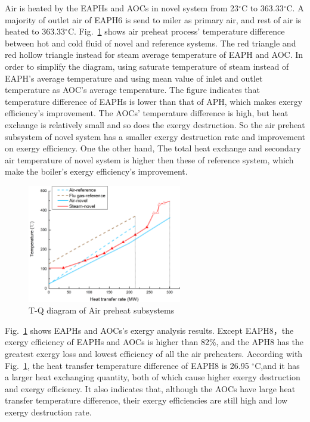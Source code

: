 \documentclass[preprint,12pt]{elsarticle}
\begin{document}
Air is heated by the EAPHs and AOCs in novel system from 23$^\circ$C to 363.33$^\circ$C. 
A majority of outlet air of EAPH6 is send to miler as primary air, and rest of air is heated to 363.33$^\circ$C.
Fig.~\ref{fig:APH_temper_compare} shows air preheat process' temperature difference between hot and cold fluid of novel and reference systems.
The red triangle and red hollow triangle instead for steam average temperature of EAPH and AOC. 
In order to simplify the diagram, using saturate temperature of steam instead of EAPH's average temperature and using mean value of inlet and outlet temperature as AOC's average temperature.
The figure indicates that  temperature difference of EAPHs is lower than that of APH, which makes exergy efficiency's improvement.
The AOCs' temperature difference is high, but heat exchange is relatively small and so does the exergy destruction. 
So the air preheat subsystem  of novel system has a smaller exergy destruction rate and improvement on exergy efficiency.
One the other hand, The total heat exchange  and secondary air temperature of novel system is higher then these of reference system, which make the boiler's exergy efficiency's improvement.

\begin{figure}[htbp]
\centering
\includegraphics[width=0.6\textwidth]{fig/APH_temper_compare.png}
\caption{T-Q diagram of Air preheat subsystems} 
\label{fig:APH_temper_compare}
\end{figure}


Fig.~\ref{fig:APH_temper_compare} shows EAPHs and AOCs's exergy analysis results. 
Except EAPH8，the exergy efficiency of EAPHs and AOCs is higher than 82\%, and the APH8 has the greatest exergy loss and lowest efficiency of all the air preheaters. 
According with Fig.~\ref{fig:APH_temper_compare}, the heat transfer temperature difference of EAPH8 is 26.95 $^\circ$C,and it has a larger heat exchanging quantity, both of which cause higher exergy destruction and exergy efficiency.
It also indicates that, although the AOCs have large heat transfer temperature difference, their exergy efficiencies are still high and low exergy destruction rate.
\end{document}
